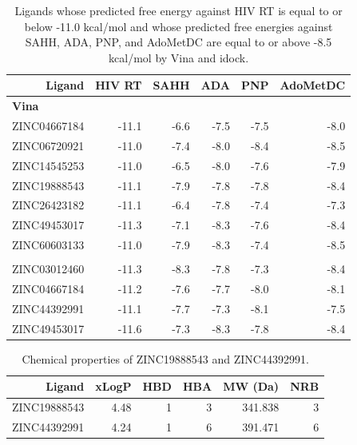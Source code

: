 \begin{table}
\centering
\begin{tabular*}
{\textwidth}
{@{\extracolsep{\fill}}rrrrrr}
\toprule
Ligand & HIV RT & SAHH & ADA & PNP & AdoMetDC\\
\midrule
\multicolumn{6}{l}{\textbf{Vina}}\\
ZINC04667184 & -11.1 & -6.6 & -7.5 & -7.5 & -8.0\\
ZINC06720921 & -11.0 & -7.4 & -8.0 & -8.4 & -8.5\\
ZINC14545253 & -11.0 & -6.5 & -8.0 & -7.6 & -7.9\\
ZINC19888543 & -11.1 & -7.9 & -7.8 & -7.8 & -8.4\\
ZINC26423182 & -11.1 & -6.4 & -7.8 & -7.4 & -7.3\\
ZINC49453017 & -11.3 & -7.1 & -8.3 & -7.6 & -8.4\\
ZINC60603133 & -11.0 & -7.9 & -8.3 & -7.4 & -8.5\\
\noalign{\smallskip\smallskip}
\multicolumn{6}{l}{\textbf{idock}}\\
ZINC03012460 & -11.3 & -8.3 & -7.8 & -7.3 & -8.4\\
ZINC04667184 & -11.2 & -7.6 & -7.7 & -8.0 & -8.1\\
ZINC44392991 & -11.1 & -7.7 & -7.3 & -8.1 & -7.5\\
ZINC49453017 & -11.6 & -7.3 & -8.3 & -7.8 & -8.4\\
\bottomrule
\end{tabular*}
\caption{Ligands whose predicted free energy against HIV RT is equal to or below -11.0 kcal/mol and whose predicted free energies against SAHH, ADA, PNP, and AdoMetDC are equal to or above -8.5 kcal/mol by Vina and idock.}
\label{tab:ShortlistedLigands}
\end{table}

\begin{table}
\centering
\begin{tabular*}
{\textwidth}
{@{\extracolsep{\fill}}rrrrrr}
\toprule
Ligand & xLogP & HBD & HBA & MW (Da) & NRB\\
\midrule
ZINC19888543 & 4.48 & 1 & 3 & 341.838 & 3\\
ZINC44392991 & 4.24 & 1 & 6 & 391.471 & 6\\
\bottomrule
\end{tabular*}
\caption{Chemical properties of ZINC19888543 and ZINC44392991.}
\label{tab:ZINC19888543-ZINC44392991}
\end{table}

